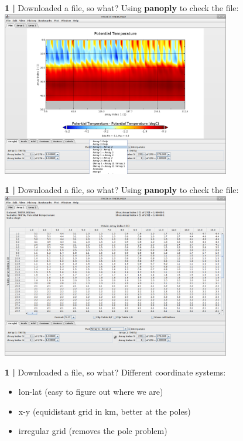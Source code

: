 \begin{frame}{\textbf{1 |} Downloaded a file, so what?}
    Using \textbf{panoply} to check the file:
    \centering\includegraphics[width=10cm]{images/Panoply7.png} \\
\end{frame}


\begin{frame}{\textbf{1 |} Downloaded a file, so what?}
    Using \textbf{panoply} to check the file:
    \centering\includegraphics[width=10cm]{images/Panoply8.png} \\
\end{frame}


\begin{frame}{\textbf{1 |} Downloaded a file, so what?}
    Different coordinate systems:
        \vspace{0.3cm}
    \begin{itemize}
        \item lon-lat (easy to figure out where we are)
            \vspace{0.3cm}
        \item x-y (equidistant grid in km, better at the poles)
            \vspace{0.3cm}
        \item irregular grid (removes the pole problem)
    \end{itemize}
\end{frame}



